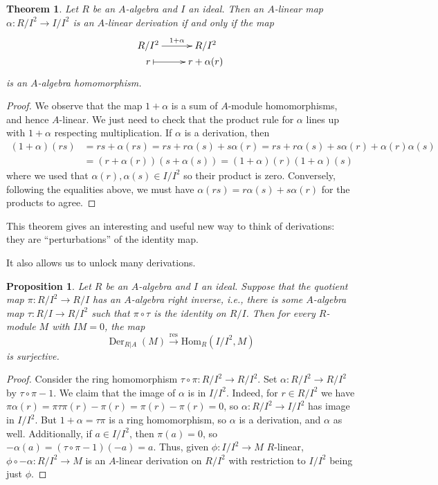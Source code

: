 \documentclass{amsart}[12pt]
\def\Der{\operatorname{Der}}
\newcommand{\Hom}{\mathrm{Hom}}
\numberwithin{equation}{section}
\theoremstyle{plain} %
\newtheorem{thm}[equation]{Theorem}
\newtheorem{prop}[equation]{Proposition}
\theoremstyle{definition}
\theoremstyle{remark}
\newcommand{\xra}[1]{\xrightarrow{#1}}
\def\res{\operatorname{res}}
\begin{document}
\begin{thm} Let $R$ be an $A$-algebra and $I$ an ideal. Then an $A$-linear map $\alpha: R/I^2 \to I/I^2$ is an $A$-linear derivation if and only if the map 
\[ \xymatrix@R=0pc{ R/I^2 \ar[r]^-{1+\alpha} &  R/I^2 \\ r \ar@{|->}[r]& r + \alpha(r) }\]
is an $A$-algebra homomorphism.
\end{thm}
\begin{proof}
We observe that the map $1+\alpha$ is a sum of $A$-module homomorphisms, and hence $A$-linear. We just need to check that the product rule for $\alpha$ lines up with $1+\alpha$ respecting multiplication. If $\alpha$ is a derivation, then
\[\begin{aligned} (1+\alpha)(rs) &= rs + \alpha(rs) =  rs + r \alpha(s) + s \alpha(r) = rs + r \alpha(s) + s \alpha(r) +\alpha(r)\alpha(s) \\&= (r+\alpha(r))(s+\alpha(s)) = (1+\alpha)(r) (1+\alpha)(s)\end{aligned}\]
where we used that $\alpha(r),\alpha(s)\in I/I^2$ so their product is zero. Conversely, following the equalities above, we must have $\alpha(rs)= r \alpha(s) + s \alpha(r)$ for the products to agree.
\end{proof}

This theorem gives an interesting and useful new way to think of derivations: they are ``perturbations''  of the identity map.

It also allows us to unlock many derivations.

\begin{prop} Let $R$ be an $A$-algebra and $I$ an ideal. Suppose that the quotient map $\pi :R/I^2 \to R/I$ has an $A$-algebra  right inverse, i.e., there is some $A$-algebra map $\tau:R/I \to R/I^2$ such that $\pi \circ \tau$ is the identity on $R/I$. Then for every $R$-module $M$ with $IM=0$, the map
\[ \Der_{R|A}(M) \xra{\res} \Hom_{{R}}(I/I^2,M)\]
is surjective.
\end{prop}
\begin{proof}
Consider the ring homomorphism $\tau \circ \pi : R/I^2 \to R/I^2$. Set $\alpha: R/I^2 \to R/I^2$ by $\tau \circ \pi-1$. We claim that the image of $\alpha$ is in $I/I^2$. Indeed, for $r\in R/I^2$ we have $\pi \alpha(r) = \pi \tau \pi(r) -\pi(r)= \pi(r)-\pi(r)=0$, so $\alpha: R/I^2 \to I/I^2$ has image in $I/I^2$. But $1+\alpha=\tau\pi$ is a ring homomorphism, so $\alpha$ is a derivation, and $\alpha$ as well. Additionally, if $a\in I/I^2$, then $\pi(a)=0$, so $-\alpha(a) = (\tau \circ \pi -1)(-a) = a$. Thus, given $\phi:I/I^2 \to M$ $R$-linear, $\phi\circ -\alpha:R/I^2 \to M$ is an $A$-linear derivation on $R/I^2$ with restriction to $I/I^2$ being just $\phi$.
\end{proof}
\end{document}
